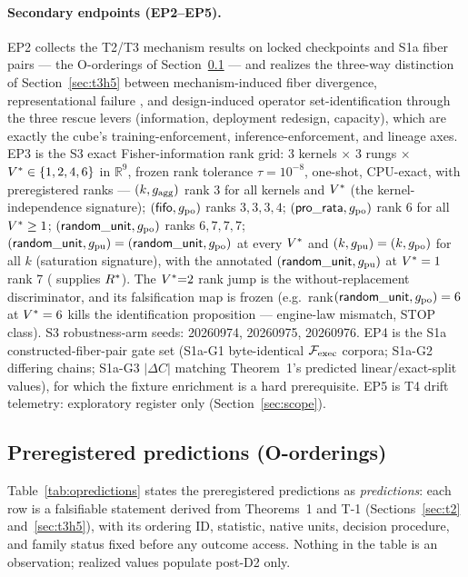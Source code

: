 \paragraph{Secondary endpoints (EP2--EP5).}
EP2 collects the T2/T3 mechanism results on locked checkpoints and S1a fiber
pairs --- the O-orderings of Section~\ref{sec:cube-predictions} --- and
realizes the three-way distinction of Section~\ref{sec:t3h5} between
mechanism-induced fiber divergence, representational failure
\citep{dolob2026}, and design-induced operator set-identification
\citep{counterfactualoperator2025} through the three rescue levers
(information, deployment redesign, capacity), which are exactly the cube's
training-enforcement, inference-enforcement, and lineage axes. EP3 is the S3
exact Fisher-information rank grid: 3 kernels $\times$ 3 rungs $\times$
$V^{*} \in \{1,2,4,6\}$ in $\mathbb{R}^{9}$, frozen rank tolerance
$\tau = 10^{-8}$, one-shot, CPU-exact, with preregistered ranks --- $(k,
g_{\mathrm{agg}})$ rank 3 for all kernels and $V^{*}$ (the kernel-independence
signature); $(\mathsf{fifo}, g_{\mathrm{po}})$ ranks $3,3,3,4$; $(\mathsf{pro\_rata}, g_{\mathrm{po}})$ rank 6 for
all $V^{*} \ge 1$; $(\mathsf{random\_unit}, g_{\mathrm{po}})$ ranks $6,7,7,7$; $(\mathsf{random\_unit},g_{\mathrm{pu}}) =
(\mathsf{random\_unit},g_{\mathrm{po}})$ at every $V^{*}$ and $(k,g_{\mathrm{pu}}) = (k,g_{\mathrm{po}})$ for all $k$
(saturation signature), with the annotated $(\mathsf{random\_unit},g_{\mathrm{pu}})$ at $V^{*} = 1$
rank 7 ( supplies $R^{*}$). The $V^{*}{=}2$ rank jump
is the without-replacement discriminator, and its falsification map is frozen
(e.g.\ rank$(\mathsf{random\_unit},g_{\mathrm{po}}) = 6$ at $V^{*} = 6$ kills the identification
proposition --- engine-law mismatch, STOP class). S3 robustness-arm seeds:
20260974, 20260975, 20260976. EP4 is the S1a constructed-fiber-pair gate set
(S1a-G1 byte-identical $\mathcal{F}_{\mathrm{exec}}$ corpora; S1a-G2 differing 
chains; S1a-G3 $|\Delta C|$ matching Theorem~1's predicted linear/exact-split
values), for which the fixture enrichment is a hard prerequisite.
EP5 is T4 drift telemetry: exploratory register only
(Section~\ref{sec:scope}).

\subsection{Preregistered predictions (O-orderings)}
\label{sec:cube-predictions}

Table~\ref{tab:opredictions} states the preregistered predictions as
\emph{predictions}: each row is a falsifiable statement derived from
Theorems~1 and T-1 (Sections~\ref{sec:t2} and~\ref{sec:t3h5}), with its
ordering ID, statistic, native units, decision procedure, and family status
fixed before any outcome access. Nothing in the table is an observation;
realized values populate post-D2 only.

